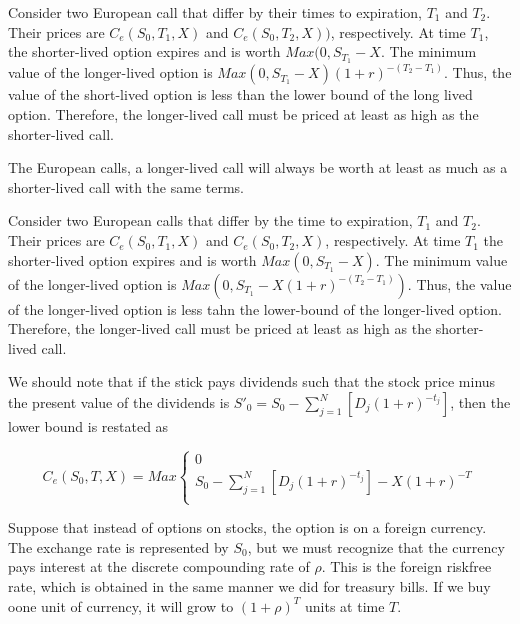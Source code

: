 \documentclass{book}
\theoremstyle{definition}
\theoremstyle{remark}
\begin{document}
            Consider two European call that differ by their times to expiration, $T_1$ and $T_2$. Their prices are $C_e(S_0, T_1, X)$ and $C_e(S_0, T_2, X))$, respectively. At time $T_1$, the shorter-lived option expires and is worth $Max(0, S_{T_1} - X$. The minimum value of the longer-lived option is $Max(0, S_{T_1} - X)(1+r)^{-(T_2 - T_1)}$. Thus, the value of the short-lived option is less than the lower bound of the long lived option. Therefore, the longer-lived call must be priced at least as high as the shorter-lived call. 

        \begin{tcolorbox}[colback=blue!5!white,colframe=blue!75!black, title=Sticky Note]
            The European calls, a longer-lived call will always be worth at least as much as a shorter-lived call with the same terms. 
        \end{tcolorbox} 
    
            Consider two European calls that  differ by the time to expiration, $T_1$ and $T_2$. Their prices are $C_e(S_0, T_1, X)$ and $C_e(S_0, T_2,X)$, respectively. At time $T_1$ the shorter-lived option expires and is worth $Max(0, S_{T_1} - X)$. The minimum value of the longer-lived option is $Max\left( 0, S_{T_1} - X(1+r)^{-(T_2 - T_1)} \right)$. Thus, the value of the longer-lived option is less tahn the lower-bound of the longer-lived option. Therefore, the longer-lived call must be priced at least as high as the shorter-lived call. 
            
            We should note that if the stick pays dividends such that the stock price minus the present value of the dividends is $S'_0 = S_0 - \sum_{j=1}^N \left [ D_j (1 + r)^{-t_j} \right]$, then the lower bound is restated as 
               
                \begin{equation}
                    C_e(S_0, T, X) = Max
                         \begin{cases}
                            0 \\
                            S_0 - \sum_{j=1}^N \left [ D_j (1 + r)^{-t_j} \right] - X(1+r)^{-T} \\
                        \end{cases}
                \end{equation}
                
            Suppose that instead of options on stocks, the option is on a foreign currency. The exchange rate is represented by $S_0$, but we must recognize that the currency pays interest at the discrete compounding rate of $\rho$. This is the foreign riskfree rate, which is obtained in the same manner we did for treasury bills. If we buy  oone unit of currency, it will grow to $(1 + \rho)^T$ units at time $T$.
            
\end{document}
